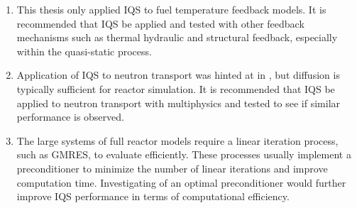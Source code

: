 \begin{enumerate}

\item This thesis only applied IQS to fuel temperature feedback models. It is recommended that IQS be applied and tested with other feedback mechanisms such as thermal hydraulic and structural feedback, especially within the quasi-static process.

\item Application of IQS to neutron transport was hinted at in , but diffusion is typically sufficient for reactor simulation. It is recommended that IQS be applied to neutron transport with multiphysics and tested to see if similar performance is observed.

\item The large systems of full reactor models require a linear iteration process, such as GMRES, to evaluate efficiently. These processes usually implement a preconditioner to minimize the number of linear iterations and improve computation time. Investigating of an optimal preconditioner would further improve IQS performance in terms of computational efficiency.

\end{enumerate}